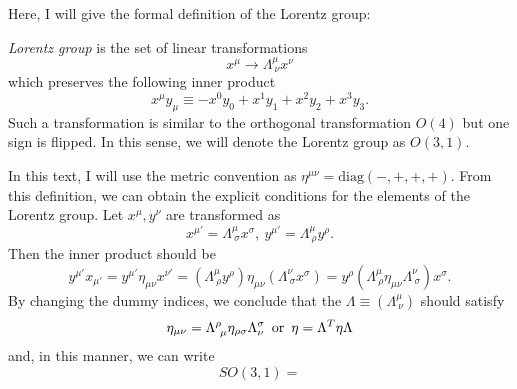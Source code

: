 \documentclass[a4paper,pdftex,10pt]{report}
\begin{document}
Here, I will give the formal definition of the Lorentz group:
\begin{graybox}
  \textit{Lorentz group} is the set of linear transformations
  \begin{equation}
    x^{\mu}
    \rightarrow
    \Lambda^{\mu}_{\ \nu}x^{\nu}
  \end{equation}
  which preserves the following inner product  
  \begin{equation}
    x^{\mu}y_{\mu}
    \equiv
    -x^{0}y_{0}
    +x^{1}y_{1}
    +x^{2}y_{2}
    +x^{3}y_{3}
    .
  \end{equation}
  Such a transformation is similar to the orthogonal transformation $O(4)$ but one sign is flipped. In this sense, we will denote the Lorentz group as $O(3,1)$. 
\end{graybox}
In this text, I will use the metric convention as $\eta^{\mu\nu}=\textrm{diag}(-,+,+,+)$. From this definition, we can obtain the explicit conditions for the elements of the Lorentz group. Let $x^{\mu}, y^{\nu}$ are transformed as 
\begin{equation}
  x^{\mu\prime}
  =
  \Lambda^{\mu}_{\ \sigma}x^{\sigma}
  ,\ 
  y^{\mu\prime}
  =
  \Lambda^{\mu}_{\ \rho}y^{\rho}
  .
\end{equation}
Then the inner product should be
\begin{equation}
  y^{\mu\prime}x_{\mu\prime}
  =
  y^{\mu\prime}\eta_{\mu\nu}x^{\nu\prime}
  =
  (\Lambda^{\mu}_{\ \rho}y^{\rho})\eta_{\mu\nu}(\Lambda^{\nu}_{\ \sigma}x^{\sigma})
  =
  y^{\rho}(\Lambda^{\mu}_{\ \rho}\eta_{\mu\nu}\Lambda^{\nu}_{\ \sigma})x^{\sigma}
  .
\end{equation}
By changing the dummy indices, we conclude that the $\Lambda\equiv(\Lambda^{\mu}_{\ \nu})$ should satisfy 
\begin{equation}
  \eta_{\mu\nu}
  =
  \Lambda^{\rho}_{\ \mu}\eta_{\rho\sigma}\Lambda^{\sigma}_{ \nu}
  \hspace*{5pt}\textrm{or}\hspace*{5pt}
  \eta
  =
  \Lambda^{T}\eta\Lambda
\end{equation} 
and, in this manner, we can write 
\begin{equation}
  SO(3,1)
  =
\end{equation}
\end{document}
